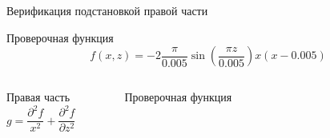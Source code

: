 \documentclass[ignoreonframetext,unicode]{beamer}
\begin{document}
\begin{frame}{Верификация подстановкой правой части}
	
	\begin{block}{Проверочная функция}
	\begin{equation*}
		f(x, z) = -2 \frac{\pi }{0.005} \sin{\left(\frac{\pi z}{0.005}\right)} x \left(x - 0.005\right)
		\label{check_func_1}
	\end{equation*}
\end{block}

\begin{columns}

\begin{block}{Правая часть}
\begin{equation*}
	g = \frac{\partial^2 f}{x^2} + \frac{\partial^2 f}{\partial z^2}
\end{equation*} 
\end{block}

\begin{figure}[!htbp]
	\caption{Проверочная функция}
	\label{check_func_1_pic}
\end{figure}


\end{columns}
\end{frame}
\end{document}
